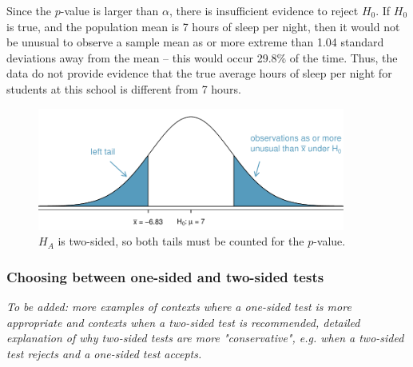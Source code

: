 \begin{spacing}{1.5}
\begin{example}
	Since the $p$-value is larger than $\alpha$, there is insufficient evidence to reject $H_0$. If $H_0$ is true, and the population mean is 7 hours of sleep per night, then it would not be unusual to observe a sample mean as or more extreme than 1.04 standard deviations away from the mean -- this would occur 29.8\% of the time. Thus, the data do not provide evidence that the true average hours of sleep per night for students at this school is different from 7 hours.
\end{example}
	
\begin{figure}[h]
	\centering
	\includegraphics[width=0.9\textwidth]
	{ch_inference_foundations_oi_biostat/figures/2ndSchSleepHTExample/2ndSchSleepHTExample}
	\caption{$H_A$ is two-sided, so both tails must be counted for the $p$-value.}
	\label{2ndSchSleepHTExample}
\end{figure}	
	

\subsubsection{Choosing between one-sided and two-sided tests}

\textit{To be added: more examples of contexts where a one-sided test is more appropriate and contexts when a two-sided test is recommended, detailed explanation of why two-sided tests are more "conservative", e.g. when a two-sided test rejects and a one-sided test accepts.} 



\end{spacing}
